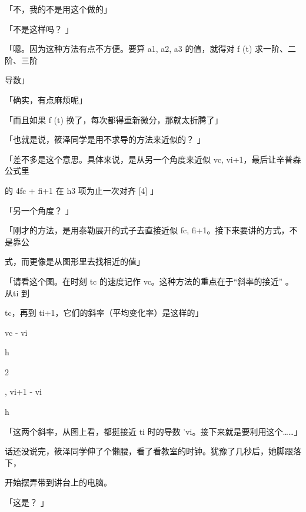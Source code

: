 「不，我的不是用这个做的」\par
「不是这样吗？ 」\par
「嗯。因为这种方法有点不方便。要算 a1, a2, a3 的值，就得对 f (t) 求一阶、二阶、三阶\par
导数」\par
「确实，有点麻烦呢」\par
「而且如果 f (t) 换了，每次都得重新微分，那就太折腾了」\par
「也就是说，筱泽同学是用不求导的方法来近似的？ 」\par
「差不多是这个意思。具体来说，是从另一个角度来近似 vc, vi+1，最后让辛普森公式里\par
的 4fc + fi+1 在 h3 项为止一次对齐 [4] 」\par
「另一个角度？ 」\par
「刚才的方法，是用泰勒展开的式子去直接近似 fc, fi+1。接下来要讲的方式，不是靠公\par
式，而更像是从图形里去找相近的值」\par
「请看这个图。在时刻 tc 的速度记作 vc。这种方法的重点在于“斜率的接近” 。从ti 到\par
tc，再到 ti+1，它们的斜率（平均变化率）是这样的」\par
vc - vi\par
h\par
2\par
, vi+1 - vi\par
h\par
「这两个斜率，从图上看，都挺接近 ti 时的导数 ˙vi。接下来就是要利用这个……」\par
话还没说完，筱泽同学伸了个懒腰，看了看教室的时钟。犹豫了几秒后，她脚跟落下，\par
开始摆弄带到讲台上的电脑。\par
「这是？ 」\par

